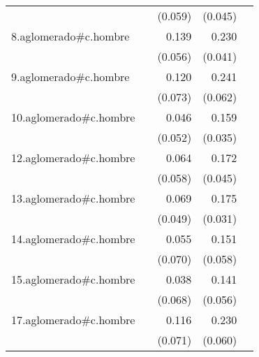 {\begin{longtable}{l*{4}{D{.}{.}{-1}}}
            &                     &     (0.059)         &     (0.045)         &                     \\
\addlinespace
8.aglomerado#c.hombre&                     &       0.139\sym{*}  &       0.230\sym{***}&                     \\
            &                     &     (0.056)         &     (0.041)         &                     \\
\addlinespace
9.aglomerado#c.hombre&                     &       0.120         &       0.241\sym{***}&                     \\
            &                     &     (0.073)         &     (0.062)         &                     \\
\addlinespace
10.aglomerado#c.hombre&                     &       0.046         &       0.159\sym{***}&                     \\
            &                     &     (0.052)         &     (0.035)         &                     \\
\addlinespace
12.aglomerado#c.hombre&                     &       0.064         &       0.172\sym{***}&                     \\
            &                     &     (0.058)         &     (0.045)         &                     \\
\addlinespace
13.aglomerado#c.hombre&                     &       0.069         &       0.175\sym{***}&                     \\
            &                     &     (0.049)         &     (0.031)         &                     \\
\addlinespace
14.aglomerado#c.hombre&                     &       0.055         &       0.151\sym{**} &                     \\
            &                     &     (0.070)         &     (0.058)         &                     \\
\addlinespace
15.aglomerado#c.hombre&                     &       0.038         &       0.141\sym{*}  &                     \\
            &                     &     (0.068)         &     (0.056)         &                     \\
\addlinespace
17.aglomerado#c.hombre&                     &       0.116         &       0.230\sym{***}&                     \\
            &                     &     (0.071)         &     (0.060)         &                     \\

\end{longtable}}
